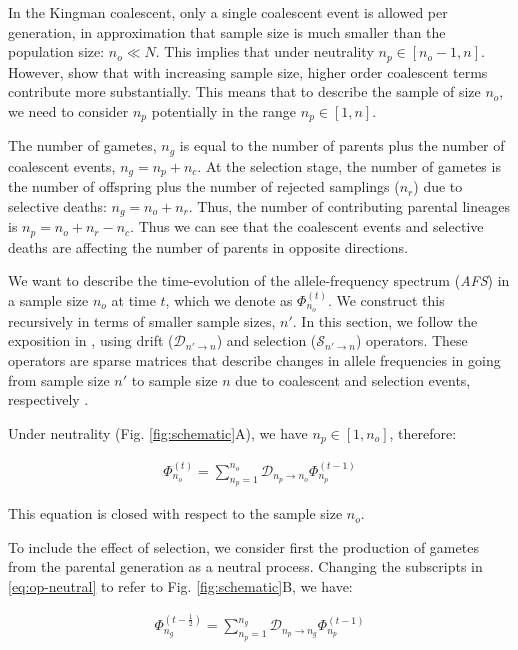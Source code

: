 \documentclass[review]{elsarticle}
\newcommand{\ra}{\rightarrow}
\newcommand{\afs}[2]{\Phi_{#1}^{(#2)}}
\begin{document}
In the Kingman coalescent, only a single coalescent event is allowed per generation, in
approximation that sample size is much smaller than the population size: $n_o \ll N$. This implies
that under neutrality $n_p \in [n_o-1, n]$. However, \citet{BhaskarEtAl2014} show that with
increasing sample size, higher order coalescent terms contribute more substantially. This means that
to describe the sample of size $n_o$, we need to consider $n_p$ potentially in the range
$n_p \in [1, n]$.

The number of gametes, $n_g$ is equal to the number of parents plus the number of coalescent events,
$n_g=n_p+n_c$. At the selection stage, the number of gametes is the number of offspring plus the
number of rejected samplings ($n_r$) due to selective deaths: $n_g = n_o+n_r$. Thus, the number of
contributing parental lineages is $n_p = n_o+n_r-n_c$. Thus we can see that the coalescent events
and selective deaths are affecting the number of parents in opposite directions.

We want to describe the time-evolution of the allele-frequency spectrum (\textit{AFS}) in a sample
size $n_o$ at time $t$, which we denote as $\afs{n_o}{t}$. We construct this recursively in terms of
smaller sample sizes, $n'$. In this section, we follow the exposition in \citet{JouganousEtAl2017},
using drift ($\mathcal{D}_{n' \ra n}$) and selection ($\mathcal{S}_{n' \ra n}$) operators. These
operators are sparse matrices that describe changes in allele frequencies in going from sample size
$n'$ to sample size $n$ due to coalescent and selection events, respectively \citep{JouganousEtAl2017}.

Under neutrality (Fig. \ref{fig:schematic}A), we have $n_p \in [1, n_o]$, therefore:

\begin{align}
  \label{eq:op-neutral}
  \afs{n_o}{t} = \sum_{n_p=1}^{n_o}\mathcal{D}_{n_p\ra n_o} \afs{n_p}{t-1}
\end{align}

This equation is closed with respect to the sample size $n_o$. 

To include the effect of selection, we consider first the production of gametes from the parental
generation as a neutral process. Changing the subscripts in \eqref{eq:op-neutral} to refer to Fig.
\ref{fig:schematic}B, we have:

\begin{align*}
  \afs{n_g}{t-\frac{1}{2}} = \sum_{n_p=1}^{n_g}\mathcal{D}_{n_p\ra n_g} \afs{n_p}{t-1}
\end{align*}
\end{document}
